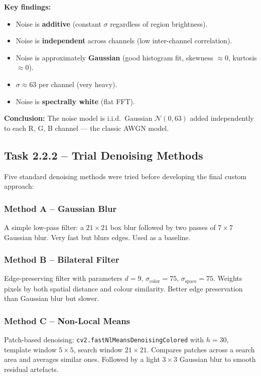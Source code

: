 \documentclass[conference, twocolumn]{IEEEtran}
\begin{document}
\textbf{Key findings:}
\begin{itemize}
    \item Noise is \textbf{additive} (constant $\sigma$ regardless of region brightness).
    \item Noise is \textbf{independent} across channels (low inter-channel correlation).
    \item Noise is approximately \textbf{Gaussian} (good histogram fit, skewness $\approx 0$, kurtosis $\approx 0$).
    \item $\sigma \approx 63$ per channel (very heavy).
    \item Noise is \textbf{spectrally white} (flat FFT).
\end{itemize}

\textbf{Conclusion:} The noise model is i.i.d.\ Gaussian $\mathcal{N}(0, 63)$ added independently to each R, G, B channel --- the classic AWGN model.

\subsection{Task 2.2.2 -- Trial Denoising Methods}

Five standard denoising methods were tried before developing the final custom approach:

\subsubsection{Method A -- Gaussian Blur}
A simple low-pass filter: a $21\times21$ box blur followed by two passes of $7\times7$ Gaussian blur. Very fast but blurs edges. Used as a baseline.

\subsubsection{Method B -- Bilateral Filter}
Edge-preserving filter with parameters $d=9$, $\sigma_{\text{color}}=75$, $\sigma_{\text{space}}=75$. Weights pixels by both spatial distance and colour similarity. Better edge preservation than Gaussian blur but slower.

\subsubsection{Method C -- Non-Local Means}
Patch-based denoising: \texttt{cv2.fastNlMeansDenoisingColored} with $h=30$, template window $5\times5$, search window $21\times21$. Compares patches across a search area and averages similar ones. Followed by a light $3\times3$ Gaussian blur to smooth residual artefacts.
\end{document}
